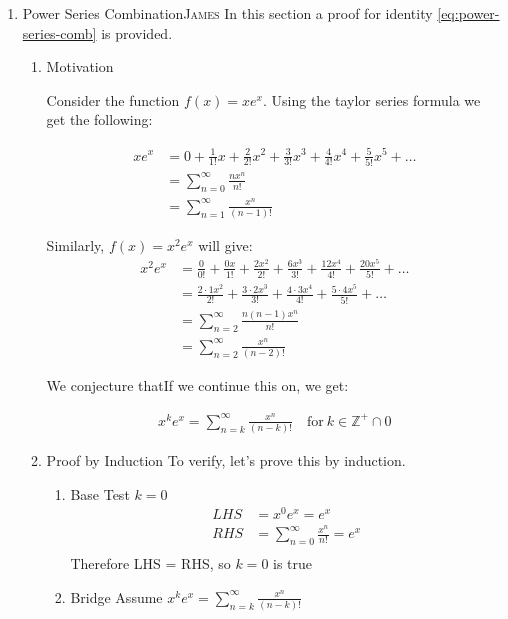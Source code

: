 \documentclass[11pt]{article}
\begin{document}
\begin{enumerate}
\item Power Series Combination\hfill{}\textsc{James}
\label{power-series-comb}
In this section a proof for identity \ref{eq:power-series-comb} is provided.
\begin{enumerate}
\item Motivation
\label{sec:orgc85576d}

Consider the function \(f(x) = xe^x\). Using the taylor series formula we get the following:

\begin{align*}
    xe^x &= 0+\frac{1}{1!}x+\frac{2}{2!}x^2+\frac{3}{3!}x^3+\frac{4}{4!}x^4+\frac{5}{5!}x^5+\dots\\
    &= \sum_{n=0}^\infty \frac{nx^n}{n!}\\
    &= \sum_{n=1}^\infty \frac{x^n}{(n-1)!}
\end{align*}

Similarly, \(f(x) = x^2e^x\) will give:
\begin{align*}
    x^2e^x &= \frac{0}{0!} + \frac{0x}{1!} + \frac{2x^2}{2!} + \frac{6x^3}{3!} + \frac{12x^4}{4!} + \frac{20x^5}{5!} + \dots\\
    &= \frac{2\cdot 1x^2}{2!} + \frac{3\cdot 2 x^3}{3!} + \frac{4\cdot 3x^4}{4!} + \frac{5\cdot 4 x^5}{5!} + \dots\\
    &= \sum_{n=2}^\infty \frac{n(n-1)x^n}{n!}\\
    &= \sum_{n=2}^\infty \frac{x^n}{(n-2)!}
\end{align*}

We conjecture thatIf we continue this on, we get:

\begin{align*}
    x^ke^x = \sum_{n=k}^\infty \frac{x^n}{(n-k)!} \quad \text{for}~k\in \mathbb{Z^{+}}\cap0
\end{align*}
\item Proof by Induction
\label{sec:org341b63a}
To verify, let's prove this by induction.
\begin{enumerate}
\item Base
\label{sec:orgdbc3148}
Test \(k=0\)
\begin{align*}
    LHS &= x^0e^x = e^x\\
    RHS &= \sum_{n=0}^\infty \frac{x^n}{n!} = e^x\\
\end{align*}
Therefore LHS = RHS, so \(k=0\) is true

\item Bridge
\label{sec:org8b07b23}
Assume \(x^k e^x = \sum_{n=k}^\infty\frac{x^n}{(n-k)!}\)


\end{enumerate}
\end{enumerate}
\end{enumerate}
\end{document}
